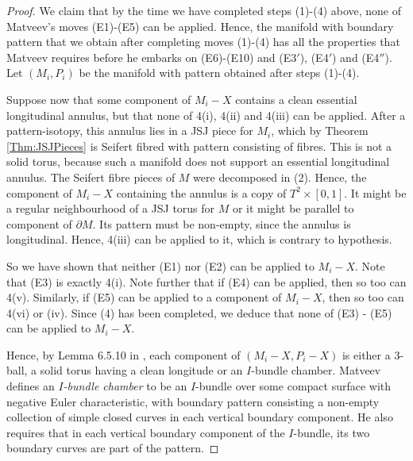 \documentclass[oneside]{amsart}
\numberwithin{equation}{section}
\theoremstyle{plain}
\theoremstyle{definition}
\begin{document}
\begin{proof}
We claim that by the time we have completed steps (1)-(4) above, none of Matveev's moves (E1)-(E5) can be applied. Hence, the manifold with boundary pattern that we obtain after completing moves (1)-(4) has all the properties that Matveev requires before he embarks on (E6)-(E10) and (E3$'$), (E4$'$) and (E4$''$). Let $(M_i, P_i)$ be the manifold with pattern obtained after steps (1)-(4).

Suppose now that some component of $M_i - X$ contains a clean essential longitudinal annulus, but that none of 4(i), 4(ii) and 4(iii) can be applied. After a pattern-isotopy, this annulus lies in a JSJ piece for $M_i$, which by Theorem \ref{Thm:JSJPieces} is Seifert fibred with pattern consisting of fibres. This is not a solid torus, because such a manifold does not support an essential longitudinal annulus. The Seifert fibre pieces of $M$ were decomposed in (2). Hence, the component of $M_i - X$ containing the annulus is a copy of $T^2 \times [0,1]$. It might be a regular neighbourhood of a JSJ torus for $M$ or it might be parallel to component of $\partial M$. Its pattern must be non-empty, since the annulus is longitudinal. Hence, 4(iii) can be applied to it, which is contrary to hypothesis.

So we have shown that neither (E1) nor (E2) can be applied to $M_i - X$. Note that (E3) is exactly 4(i). Note further that if (E4) can be applied, then so too can 4(v). Similarly, if (E5) can be applied to a component of $M_i - X$, then so too can 4(vi) or (iv). Since (4) has been completed, we deduce that none of (E3) - (E5) can be applied to $M_i - X$.

Hence, by Lemma 6.5.10 in \cite{Matveev}, each component of $(M_i - X, P_i - X)$ is either a 3-ball, a solid torus having a clean longitude or an $I$-bundle chamber. Matveev defines an \emph{$I$-bundle chamber} to be an $I$-bundle over some compact surface with negative Euler characteristic, with boundary pattern consisting a non-empty collection of simple closed curves in each vertical boundary component. He also requires that in each vertical boundary component of the $I$-bundle, its two boundary curves are part of the pattern.


\end{proof}
\end{document}
